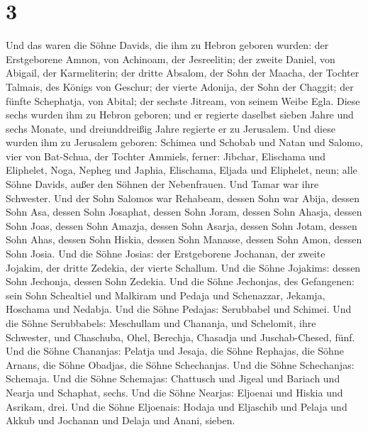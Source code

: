 \hypertarget{section-2}{%
\section{3}\label{section-2}}

 Und das waren die Söhne Davids, die ihm zu Hebron geboren
wurden: der Erstgeborene Amnon, von Achinoam, der Jesreelitin; der
zweite Daniel, von Abigail, der Karmeliterin;  der dritte
Absalom, der Sohn der Maacha, der Tochter Talmais, des Königs von
Geschur; der vierte Adonija, der Sohn der Chaggit;  der
fünfte Schephatja, von Abital; der sechste Jitream, von seinem Weibe
Egla.  Diese sechs wurden ihm zu Hebron geboren; und er
regierte daselbst sieben Jahre und sechs Monate, und dreiunddreißig
Jahre regierte er zu Jerusalem.  Und diese wurden ihm zu
Jerusalem geboren: Schimea und Schobab und Natan und Salomo, vier von
Bat-Schua, der Tochter Ammiels,  ferner: Jibchar,
Elischama und Eliphelet,  Noga, Nepheg und Japhia,
 Elischama, Eljada und Eliphelet, neun; 
alle Söhne Davids, außer den Söhnen der Nebenfrauen. Und Tamar war ihre
Schwester.  Und der Sohn Salomos war Rehabeam, dessen
Sohn war Abija, dessen Sohn Asa, dessen Sohn Josaphat, 
dessen Sohn Joram, dessen Sohn Ahasja, dessen Sohn Joas, 
dessen Sohn Amazja, dessen Sohn Asarja, dessen Sohn Jotam,
 dessen Sohn Ahas, dessen Sohn Hiskia, dessen Sohn
Manasse,  dessen Sohn Amon, dessen Sohn Josia.
 Und die Söhne Josias: der Erstgeborene Jochanan, der
zweite Jojakim, der dritte Zedekia, der vierte Schallum. 
Und die Söhne Jojakims: dessen Sohn Jechonja, dessen Sohn Zedekia.
 Und die Söhne Jechonjas, des Gefangenen: sein Sohn
Schealtiel  und Malkiram und Pedaja und Schenazzar,
Jekamja, Hoschama und Nedabja.  Und die Söhne Pedajas:
Serubbabel und Schimei. Und die Söhne Serubbabels: Meschullam und
Chananja, und Schelomit, ihre Schwester,  und Chaschuba,
Ohel, Berechja, Chasadja und Juschab-Chesed, fünf.  Und
die Söhne Chananjas: Pelatja und Jesaja, die Söhne Rephajas, die Söhne
Arnans, die Söhne Obadjas, die Söhne Schechanjas.  Und
die Söhne Schechanjas: Schemaja. Und die Söhne Schemajas: Chattusch und
Jigeal und Bariach und Nearja und Schaphat, sechs.  Und
die Söhne Nearjas: Eljoenai und Hiskia und Asrikam, drei.
 Und die Söhne Eljoenais: Hodaja und Eljaschib und Pelaja
und Akkub und Jochanan und Delaja und Anani, sieben.

